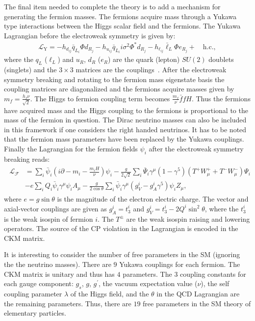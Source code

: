 The final item needed to complete the theory is to add a mechanism for generating the fermion masses. The fermions acquire mass through a Yukawa type interactions between the Higgs scalar field and the fermions. The Yukawa Lagrangian before the electroweak symmetry is given by:
\begin{eqnarray} \label{eq:yukawa}
\mathcal{L_{\mathrm{Y}}} = -h_{d_{ij}} \bar{q}_{L_{i}} \Phi d_{R_j}  - h_{u_{ij}} \bar{q}_{L_{i}} i\sigma^{2}\Phi^{*}d_{R_j} - h_{\ell_{ij}} \bar{\ell}_L \Phi e_{R_j} + \quad \mathrm{h.c.}, 
\end{eqnarray}   
where the $q_L$ ($\ell_L$) and $u_R$, $d_R$ ($e_R$) are the quark (lepton) $SU(2)$ doublets (singlets) and the $3\times3$ matrices are the couplings~\cite{Agashe:2014kda}. After the electroweak symmetry breaking and rotating to the fermion mass eigenstate basis the coupling matrices are diagonalized and the fermions acquire masses given by $m_{f} = \frac{h_f \nu}{\sqrt{2}}$. The Higgs to fermion coupling term becomes $\frac{m_{f}}{\nu}\bar{f}fH$. Thus the fermions have acquired mass and the Higgs coupling to the fermions is proportional to the mass of the fermion in question. The Dirac neutrino masses can also be included in this framework if one considers the right handed neutrinos. It has to be noted that the fermion mass parameters have been replaced by the Yukawa couplings. Finally the Lagrangian for the fermion fields $\psi_{i}$ after the electroweak symmetry breaking reads:
\begin{eqnarray} \label{eq:lf}
\begin{aligned}
\mathcal{L_F} &= \sum_{i} \bar{\psi}_{i} (i\partial - m_{i} - \frac{m_{i}H}{\nu}) \psi_{i} -\frac{g}{2\sqrt{2}}\sum_{i}\bar{\Psi}_i \gamma^{\mu}(1-\gamma^5)(T^{+}W_{\mu}^{+} + T^{-} W_{\mu}^{-})\Psi_{i}  \\
& -e\sum_{i} Q_i \bar{\psi}_{i} \gamma^{\mu} \psi_i A_{\mu} - \frac{g}{2\cos\theta}\sum_{i}\bar{\psi}_i \gamma^{\mu}(g_{V}^{i}-g_{A}^{i}\gamma^{5})\psi_{i}Z_{\mu}, 
\end{aligned}
\end{eqnarray}
where $e=g \sin \theta$ is the magnitude of the electron electric charge. The vector and axial-vector couplings are given as $g_{A}^{i}=t^{i}_{3}$ and $g_{V}^{i}=t^{i}_{3}-2Q^{i} \sin^{2} \theta$, where the  $t^{i}_{3}$ is the weak isospin of fermion $i$. The $T^{\pm}$ are the weak isospin raising and lowering operators. The source of the CP violation in the Lagrangian is encoded in the CKM matrix.

It is interesting to consider the number of free parameters in the SM (ignoring the the neutrino masses). There are $9$ Yukawa couplings for each fermion. The CKM matrix is unitary and thus has $4$ parameters. The $3$ coupling constants for each gauge component: $g_s$, $g$, $g^{'}$, the vacuum expectation value ($\nu$), the self coupling parameter $\lambda$ of the Higgs field, and the $\theta$ in the QCD Lagrangian are the remaining parameters. Thus, there are $19$ free parameters in the SM theory of elementary particles. 

